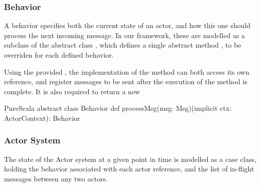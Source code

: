 \subsubsection*{Behavior}

A behavior specifies both the current state of an actor, and how this one should 
process the next incoming message. In our framework, these are modelled as a subclass 
of the abstract class , which defines a single abstract method 
, to be overriden for each defined behavior.

Using the provided , the implementation of the 
method can both access its own reference, and register messages to be sent after the
execution of the method is complete. It is also required to return a new 

\begin{ShortCode}{PureScala}
abstract class Behavior {
  def processMsg(msg: Msg)(implicit ctx: ActorContext): Behavior
}
\end{ShortCode}

%
%

\subsubsection*{Actor System}

The state of the Actor system at a given point in time is modelled as a case class, 
holding the behavior associated with each actor reference, and the list of in-flight messages between any two actors.


